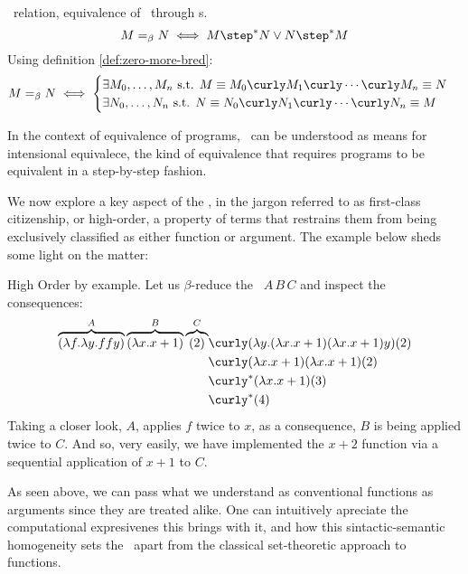 \begin{definition} \bequiv \ relation, equivalence of \lterms \ through \bred s.
  \[
    M =_\beta N \iff M \step^* N \lor N \step^* M
  \]
 Using definition \ref{def:zero-more-bred}:
  \[
    M =_\beta N \iff
    \begin{cases}
      \exists M_0, \dots, M_n \text{ s.t. } M \equiv M_0 \curly M_1 \curly \cdots \curly M_n \equiv N \\
      \exists N_0, \dots, N_n \text{ s.t. } N \equiv N_0 \curly N_1 \curly \cdots \curly N_n \equiv M
    \end{cases}
  \]
\end{definition}
\begin{remark}
  In the context of equivalence of programs, \bequiv \ can be understood as means for intensional equivalece, the kind of equivalence that requires programs to be equivalent in a step-by-step fashion.
\end{remark}
We now explore a key aspect of the \lcalc, in the jargon referred to as first-class citizenship, or high-order, a property of terms that restrains them from being exclusively classified as either function or argument. The example below sheds some light on the matter:
\begin{example} High Order by example. Let us $\beta$-reduce the \lterm \ $ A \, B \, C $ and inspect the consequences:
  \label{ex:high-order-by-example}
\begin{align*}
  \overbrace { (\lambda f . \lambda y . f f y) }^{A} \overbrace{ (\lambda x . x + 1) }^{B} \overbrace{(2)}^{C}
  &\curly (\lambda y .(\lambda x . x + 1) (\lambda x . x + 1)y)(2) \\
  &\curly (\lambda x . x + 1)(\lambda x . x + 1)(2) \\
  &\curly^* (\lambda x . x + 1) (3) \\
  &\curly^* (4)
\end{align*}
Taking a closer look, $A$, applies $f$ twice to $x$, as a consequence, $B$ is being applied twice to $C$. And so, very easily, we have implemented the $ x + 2 $ function via a sequential application of $x + 1$ to $C$.
\end{example}
\begin{remark}
  As seen above, we can pass what we understand as conventional functions as arguments since they are treated alike.  One can intuitively apreciate the computational expresivenes this brings with it, and how this sintactic-semantic homogeneity sets the \lcalc \ apart from the classical set-theoretic approach to functions.
\end{remark}

